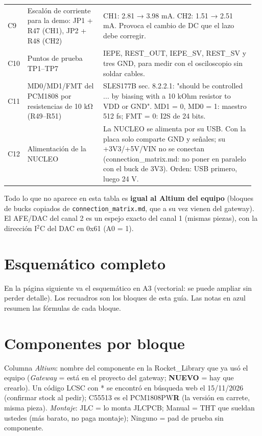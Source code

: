 \documentclass[10pt,a4paper]{article}
\begin{document}
\begin{longtable}{@{}L{0.06\linewidth}L{0.3\linewidth}L{0.6\linewidth}@{}}
C9 & Escalón de corriente para la demo: JP1 + R47 (CH1), JP2 + R48 (CH2) & CH1: 2.81 → 3.98 mA. CH2: 1.51 → 2.51 mA. Provoca el cambio de DC que el lazo debe corregir.\\[2pt]
C10 & Puntos de prueba TP1–TP7 & IEPE, REST\_\allowbreak{}OUT, IEPE\_\allowbreak{}SV, REST\_\allowbreak{}SV y tres GND, para medir con el osciloscopio sin soldar cables.\\[2pt]
C11 & MD0/MD1/FMT del PCM1808 por resistencias de 10 kΩ (R49–R51) & SLES177B sec. 8.2.2.1: "should be controlled ... by biasing with a 10 kOhm resistor to VDD or GND". MD1 = 0, MD0 = 1: maestro 512 fs; FMT = 0: I2S de 24 bits.\\[2pt]
C12 & Alimentación de la NUCLEO & La NUCLEO se alimenta por su USB. Con la placa solo comparte GND y señales; su +3V3/+5V/VIN no se conectan (connection\_\allowbreak{}matrix.md: no poner en paralelo con el buck de 3V3). Orden: USB primero, luego 24 V.\\[2pt]
\bottomrule\end{longtable}
Todo lo que no aparece en esta tabla es \textbf{igual al Altium del equipo} (bloques de bucks
copiados de \texttt{connection\_matrix.md}, que a su vez vienen del gateway). El AFE/DAC del canal 2 es un
espejo exacto del canal 1 (mismas piezas), con la dirección I$^2$C del DAC en 0x61 (A0 = 1).
\section{Esquemático completo}\label{sec:esq}
En la página siguiente va el esquemático en A3 (vectorial: se puede ampliar sin perder detalle).
Los recuadros son los bloques de esta guía. Las notas en azul resumen las fórmulas de cada bloque.

\section{Componentes por bloque}
Columna \emph{Altium}: nombre del componente en la Rocket\_Library que ya usó el equipo (\emph{Gateway} = está
en el proyecto del gateway; \textbf{NUEVO} = hay que crearlo). Un código LCSC con * se encontró en búsqueda web
el 15/11/2026 (confirmar stock al pedir); C55513 es el PCM1808PW\textbf{R} (la versión en carrete, misma pieza).
\emph{Montaje}: JLC = lo monta JLCPCB; Manual = THT que sueldan ustedes (más barato, no paga montaje);
Ninguno = pad de prueba sin componente.
\end{document}
